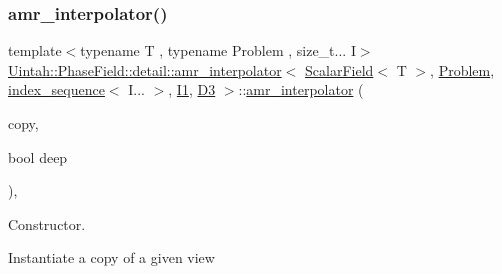 \subsubsection{\texorpdfstring{amr\+\_\+interpolator()}{amr\_interpolator()}\hspace{0.1cm}{\footnotesize\ttfamily [1/4]}}
{\footnotesize\ttfamily template$<$typename T , typename Problem , size\+\_\+t... I$>$ \\
\hyperlink{classUintah_1_1PhaseField_1_1detail_1_1amr__interpolator}{Uintah\+::\+Phase\+Field\+::detail\+::amr\+\_\+interpolator}$<$ \hyperlink{structUintah_1_1PhaseField_1_1ScalarField}{Scalar\+Field}$<$ T $>$, \hyperlink{classUintah_1_1PhaseField_1_1Problem}{Problem}, \hyperlink{namespaceUintah_1_1PhaseField_a237de804d99512e50613aff7c94a9461}{index\+\_\+sequence}$<$ I... $>$, \hyperlink{namespaceUintah_1_1PhaseField_a547ce3002aa97fbd3ef3192a6eec8406a66f19efe774b0d2b6e5844eb2d83d305}{I1}, \hyperlink{namespaceUintah_1_1PhaseField_a12bfc68444894dffdf0cb8d9cf0cc76aa72fd61934c7ca788c49ad90629f76e78}{D3} $>$\+::\hyperlink{classUintah_1_1PhaseField_1_1detail_1_1amr__interpolator}{amr\+\_\+interpolator} (\begin{DoxyParamCaption}\item[{const \hyperlink{classUintah_1_1PhaseField_1_1detail_1_1amr__interpolator}{amr\+\_\+interpolator}$<$ \hyperlink{structUintah_1_1PhaseField_1_1ScalarField}{Scalar\+Field}$<$ T $>$, \hyperlink{classUintah_1_1PhaseField_1_1Problem}{Problem}, \hyperlink{namespaceUintah_1_1PhaseField_a237de804d99512e50613aff7c94a9461}{index\+\_\+sequence}$<$ I... $>$, \hyperlink{namespaceUintah_1_1PhaseField_a547ce3002aa97fbd3ef3192a6eec8406a66f19efe774b0d2b6e5844eb2d83d305}{I1}, \hyperlink{namespaceUintah_1_1PhaseField_a12bfc68444894dffdf0cb8d9cf0cc76aa72fd61934c7ca788c49ad90629f76e78}{D3} $>$ $\ast$}]{copy,  }\item[{bool}]{deep }\end{DoxyParamCaption})\hspace{0.3cm}{\ttfamily [inline]}, {\ttfamily [protected]}}



Constructor. 

Instantiate a copy of a given view


